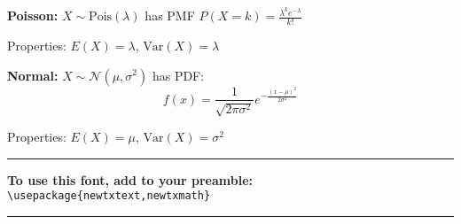 \documentclass[10pt]{article}
\newcommand{\var}{\textrm{Var}}
\newcommand{\N}{\mathcal{N}}
\newcommand{\Pois}{\textrm{Pois}}
\begin{document}
\textbf{Poisson:} $X \sim \Pois(\lambda)$ has PMF $P(X = k) = \frac{\lambda^k e^{-\lambda}}{k!}$

Properties: $E(X) = \lambda$, $\var(X) = \lambda$

\textbf{Normal:} $X \sim \N(\mu, \sigma^2)$ has PDF:
\[f(x) = \frac{1}{\sqrt{2\pi\sigma^2}} e^{-\frac{(x-\mu)^2}{2\sigma^2}}\]

Properties: $E(X) = \mu$, $\var(X) = \sigma^2$

\vspace{1cm}
\begin{center}
\rule{\textwidth}{0.4pt}

\textbf{To use this font, add to your preamble:} \\
\verb|\usepackage{newtxtext,newtxmath}|

\rule{\textwidth}{0.4pt}
\end{center}
\end{document}
